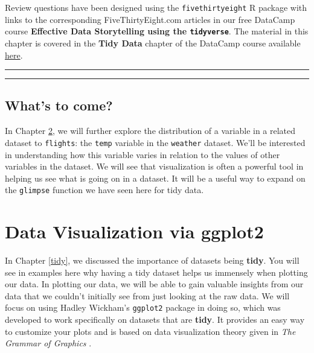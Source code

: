 \documentclass[]{tufte-book}
\let\oldrule=\rule
\renewcommand{\rule}[1]{\oldrule{\linewidth}}
\theoremstyle{definition}
\theoremstyle{definition}
\theoremstyle{remark}
\begin{document}
Review questions have been designed using the \texttt{fivethirtyeight} R
package \citep{R-fivethirtyeight} with links to the corresponding
FiveThirtyEight.com articles in our free DataCamp course
\textbf{Effective Data Storytelling using the \texttt{tidyverse}}. The
material in this chapter is covered in the \textbf{Tidy Data} chapter of
the DataCamp course available
\href{https://campus.datacamp.com/courses/effective-data-storytelling-using-the-tidyverse/tidy-data}{here}.

\begin{center}\rule{0.5\linewidth}{\linethickness}\end{center}

\begin{center}\rule{0.5\linewidth}{\linethickness}\end{center}

\section{What's to come?}\label{whats-to-come}

In Chapter \ref{viz}, we will further explore the distribution of a
variable in a related dataset to \texttt{flights}: the \texttt{temp}
variable in the \texttt{weather} dataset. We'll be interested in
understanding how this variable varies in relation to the values of
other variables in the dataset. We will see that visualization is often
a powerful tool in helping us see what is going on in a dataset. It will
be a useful way to expand on the \texttt{glimpse} function we have seen
here for tidy data.

\chapter{Data Visualization via ggplot2}\label{viz}

In Chapter \ref{tidy}, we discussed the importance of datasets being
\textbf{tidy}. You will see in examples here why having a tidy dataset
helps us immensely when plotting our data. In plotting our data, we will
be able to gain valuable insights from our data that we couldn't
initially see from just looking at the raw data. We will focus on using
Hadley Wickham's \texttt{ggplot2} package in doing so, which was
developed to work specifically on datasets that are \textbf{tidy}. It
provides an easy way to customize your plots and is based on data
visualization theory given in \emph{The Grammar of Graphics}
\citep{wilkinson2005}.
\end{document}
